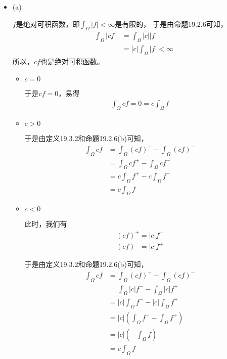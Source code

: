 \documentclass{article}
\begin{document}
\begin{itemize}
  \item (a)

        $f$是绝对可积函数，即$\int_{\Omega} |f| < \infty$是有限的，
        于是由命题19.2.6可知，
        \begin{align*}
          \int_{\Omega} |cf|
           & = \int_{\Omega} |c||f|          \\
           & = |c|\int_{\Omega} |f| < \infty
        \end{align*}
        所以，$cf$也是绝对可积函数。

        \begin{itemize}
          \item $c = 0$

                于是$cf = 0$，易得
                \begin{align*}
                  \int_{\Omega} cf = 0 = c \int_{\Omega} f
                \end{align*}

          \item $c > 0$

                于是由定义19.3.2和命题19.2.6(b)可知，
                \begin{align*}
                  \int_{\Omega} cf
                   & = \int_{\Omega} (cf)^+ - \int_{\Omega} (cf)^- \\
                   & = \int_{\Omega} cf^+ - \int_{\Omega} cf^-     \\
                   & = c \int_{\Omega} f^+ - c \int_{\Omega} f^-   \\
                   & = c \int_{\Omega} f
                \end{align*}

          \item $c < 0$

                此时，我们有
                \begin{align*}
                  (cf)^+ = |c|f^- \\
                  (cf)^- = |c|f^+
                \end{align*}

                于是由定义19.3.2和命题19.2.6(b)可知，
                \begin{align*}
                  \int_{\Omega} cf
                   & = \int_{\Omega} (cf)^+ - \int_{\Omega} (cf)^- \\
                   & = \int_{\Omega} |c|f^- - \int_{\Omega} |c|f^+ \\
                   & = |c|\int_{\Omega} f^- - |c|\int_{\Omega} f^+ \\
                   & = |c|(\int_{\Omega} f^- - \int_{\Omega} f^+)  \\
                   & = |c| (- \int_{\Omega} f)                     \\
                   & = c \int_{\Omega} f
                \end{align*}
        \end{itemize}


\end{itemize}
\end{document}
